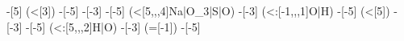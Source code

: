 \begin{struct}
{                                                                                                                                                                -[5]
                                                                                                                                                                    (<[3])
                                                                                                                                                                -[-5]
                                                                                                                                                                -[-3]
                                                                                                                                                                -[-5]
                                                                                                                                                                    (<[5,,,4]Na|O_3|S|O)
                                                                                                                                                                -[-3]
                                                                                                                                                                    (<:[-1,,,1]O|H)
                                                                                                                                                                -[-5]
                                                                                                                                                                    (<[5])
                                                                                                                                                                -[-3]
                                                                                                                                                                -[-5]
                                                                                                                                                                    (<:[5,,,2]H|O)
                                                                                                                                                                -[-3]
                                                                                                                                                                    (=[-1])
                                                                                                                                                                -[-5]
}
\end{struct}
